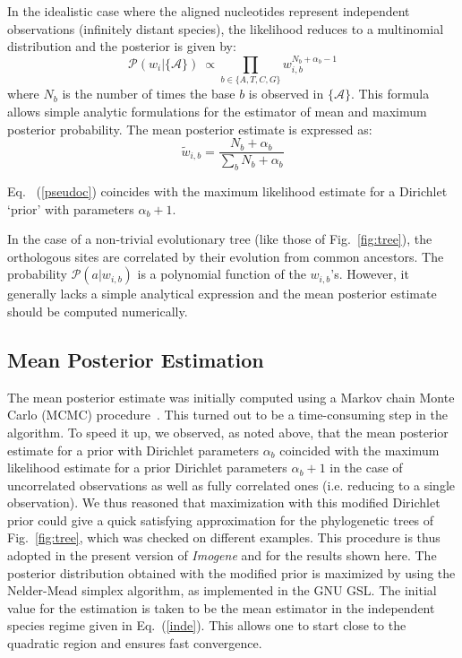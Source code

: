 \documentclass[a4,center,fleqn]{NAR}
\newcommand{\proba}{\mathcal{P}}
\begin{document}
In the idealistic case where the aligned nucleotides represent independent
observations (infinitely distant species), the likelihood reduces to
a multinomial distribution and the posterior is given by:
\begin{equation}
   \proba(w_{i}|\{\mathcal{A}\})\ \propto \prod_{b \in \{A,T,C,G\}} w_{i,b}^{N_b + \alpha_b-1}
   \label{inde}
\end{equation}
where $N_b$ is the number of times the base $b$ is observed in
$\{\mathcal{A}\}$. 
This formula allows simple analytic formulations for the estimator of mean and
maximum posterior probability.
The mean posterior estimate is expressed as:
\begin{equation}
\tilde{w}_{i,b} = \frac{N_b+\alpha_b}{\sum_b N_b+\alpha_b}
\label{pseudoc}
\end{equation}

Eq. ~(\ref{pseudoc}) coincides with the maximum likelihood estimate for
a Dirichlet `prior' with parameters $\alpha_b + 1$.

In the case of a non-trivial evolutionary tree (like those of
Fig.~\ref{fig:tree}), the orthologous sites are correlated by their evolution
from common ancestors.
The probability $\proba(a|w_{i,b})$ is a polynomial function of the
$w_{i,b}$'s.
However, it generally lacks a simple analytical expression and the mean
posterior estimate should be computed numerically.    


\subsection*{Mean Posterior Estimation}
The mean posterior estimate was initially computed using a Markov chain Monte
Carlo (MCMC) procedure~\cite{bishop}.
This turned out to be a time-consuming step in the algorithm.
To speed it up, we observed, as noted above, that the mean posterior estimate
for a prior with Dirichlet parameters $\alpha_b $ coincided with the maximum
likelihood estimate for a prior Dirichlet parameters $\alpha_b +1$ in the case
of uncorrelated observations as well as fully correlated ones (i.e. reducing to
a single observation).
We thus reasoned that maximization with this modified
Dirichlet prior could give a quick satisfying approximation for the
phylogenetic trees of Fig.~\ref{fig:tree}, which was checked on different
examples.
This procedure is thus adopted in the present version of {\em Imogene} and for
the results shown here.
The  posterior distribution obtained with the modified prior  is maximized by
using the Nelder-Mead simplex algorithm, as implemented in the GNU GSL. 
The initial value for the estimation is taken to be the mean estimator in the
independent species regime given in Eq.~(\ref{inde}).
This allows one to start close to the quadratic region and ensures fast
convergence.
\end{document}
